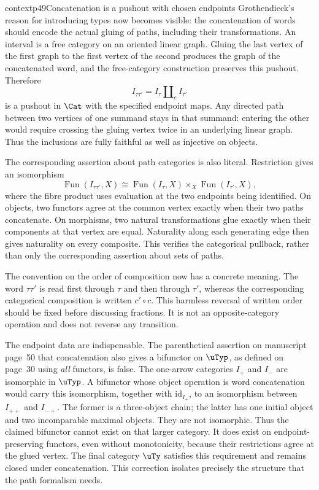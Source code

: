 \begin{dcomment}{context}{p49}{Concatenation is a pushout with chosen endpoints}
Grothendieck's reason for introducing types now becomes visible: the concatenation of words should encode the actual gluing of paths, including their transformations. An interval is a free category on an oriented linear graph. Gluing the last vertex of the first graph to the first vertex of the second produces the graph of the concatenated word, and the free-category construction preserves this pushout. Therefore
\[
 I_{\tau\tau'}=I_\tau\amalg_e I_{\tau'}
\]
is a pushout in $\Cat$ with the specified endpoint maps. Any directed path between two vertices of one summand stays in that summand: entering the other would require crossing the gluing vertex twice in an underlying linear graph. Thus the inclusions are fully faithful as well as injective on objects.

The corresponding assertion about path categories is also literal. Restriction gives an isomorphism
\[
 \operatorname{Fun}(I_{\tau\tau'},X)
 \cong
 \operatorname{Fun}(I_\tau,X)
 \times_X\operatorname{Fun}(I_{\tau'},X),
\]
where the fibre product uses evaluation at the two endpoints being identified. On objects, two functors agree at the common vertex exactly when their two paths concatenate. On morphisms, two natural transformations glue exactly when their components at that vertex are equal. Naturality along each generating edge then gives naturality on every composite. This verifies the categorical pullback, rather than only the corresponding assertion about sets of paths.

The convention on the order of composition now has a concrete meaning. The word $\tau\tau'$ is read first through $\tau$ and then through $\tau'$, whereas the corresponding categorical composition is written $c'\circ c$. This harmless reversal of written order should be fixed before discussing fractions. It is not an opposite-category operation and does not reverse any transition.

The endpoint data are indispensable. The parenthetical assertion on manuscript page~50 that concatenation also gives a bifunctor on $\uTyp$, as defined on page~30 using \emph{all} functors, is false. The one-arrow categories $I_+$ and $I_-$ are isomorphic in $\uTyp$. A bifunctor whose object operation is word concatenation would carry this isomorphism, together with $\mathrm{id}_{I_+}$, to an isomorphism between $I_{++}$ and $I_{-+}$. The former is a three-object chain; the latter has one initial object and two incomparable maximal objects. They are not isomorphic. Thus the claimed bifunctor cannot exist on that larger category. It does exist on endpoint-preserving functors, even without monotonicity, because their restrictions agree at the glued vertex. The final category $\uTy$ satisfies this requirement and remains closed under concatenation. This correction isolates precisely the structure that the path formalism needs.
\end{dcomment}

